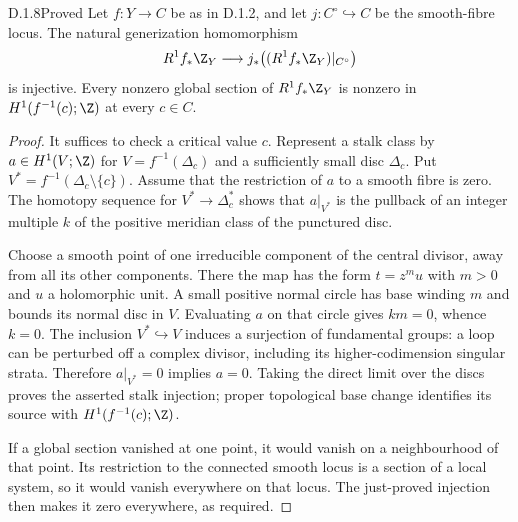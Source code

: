 \begin{idstatement}{D.1.8}{Proved}\label{st:D.1.8}
Let $f:Y\to C$ be as in D.1.2, and let $j:C^\circ\hookrightarrow C$
be the smooth-fibre locus. The natural generization homomorphism
\[
R^1f_*\Z_Y\longrightarrow
j_*\bigl((R^1f_*\Z_Y)|_{C^\circ}\bigr)
\]
is injective. Every nonzero global section of $R^1f_*\Z_Y$ is
nonzero in $H^1(f^{-1}(c);\Z)$ at every $c\in C$.
\end{idstatement}
\begin{proof}
It suffices to check a critical value $c$. Represent a stalk class
by $a\in H^1(V;\Z)$ for $V=f^{-1}(\Delta_c)$ and a sufficiently
small disc $\Delta_c$. Put $V^*=f^{-1}(\Delta_c\setminus\{c\})$.
Assume that the restriction of $a$ to a smooth fibre is zero.
The homotopy sequence for $V^*\to\Delta_c^*$ shows that
$a|_{V^*}$ is the pullback of an integer multiple $k$ of the
positive meridian class of the punctured disc.

Choose a smooth point of one irreducible component of the central
divisor, away from all its other components. There the map has
the form $t=z^m u$ with $m>0$ and $u$ a holomorphic unit.
A small positive normal circle has base winding $m$ and bounds
its normal disc in $V$. Evaluating $a$ on that circle gives
$km=0$, whence $k=0$.
The inclusion $V^*\hookrightarrow V$ induces a surjection of
fundamental groups: a loop can be perturbed off a complex divisor,
including its higher-codimension singular strata. Therefore
$a|_{V^*}=0$ implies $a=0$.
Taking the direct limit over the discs proves the asserted stalk
injection; proper topological base change identifies its source
with $H^1(f^{-1}(c);\Z)$.

If a global section vanished at one point, it would vanish on a
neighbourhood of that point. Its restriction to the connected
smooth locus is a section of a local system, so it would vanish
everywhere on that locus. The just-proved injection then makes
it zero everywhere, as required.
\end{proof}



